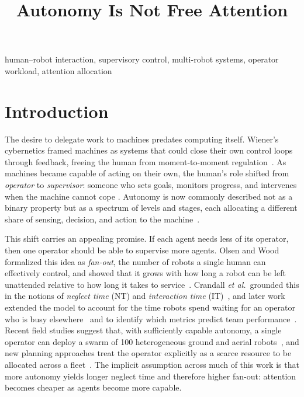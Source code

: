 \documentclass[conference]{IEEEtran}
\begin{document}
\title{Autonomy Is Not Free Attention}

\author{
}

\maketitle

\begin{abstract}


\end{abstract}

\begin{IEEEkeywords}
human–robot interaction, supervisory control, multi-robot systems, operator workload, attention allocation
\end{IEEEkeywords}

\section{Introduction}
\label{sec:intro}
The desire to delegate work to machines predates computing itself.
Wiener's cybernetics framed machines as systems that could close
their own control loops through feedback, freeing the human from
moment-to-moment regulation~\cite{wiener1948cybernetics}. As machines
became capable of acting on their own, the human's role shifted from
\emph{operator} to \emph{supervisor}: someone who sets goals,
monitors progress, and intervenes when the machine cannot cope
\cite{sheridan1992telerobotics}. Autonomy is now commonly described
not as a binary property but as a spectrum of levels and stages,
each allocating a different share of sensing, decision, and action
to the machine~\cite{parasuraman2000model}.

This shift carries an appealing promise. If each agent needs less
of its operator, then one operator should be able to supervise more
agents. Olsen and Wood formalized this idea as \emph{fan-out}, the
number of robots a single human can effectively control, and showed
that it grows with how long a robot can be left unattended relative
to how long it takes to service~\cite{olsen2004fanout}. Crandall
\emph{et al.}\ grounded this in the notions of \emph{neglect time}
(NT) and \emph{interaction time} (IT)~\cite{crandall2005validating},
and later work extended the model to account for the time robots
spend waiting for an operator who is busy
elsewhere~\cite{cummings2008predicting} and to identify which metrics
predict team performance~\cite{crandall2007identifying}. Recent field
studies suggest that, with sufficiently capable autonomy, a single
operator can deploy a swarm of 100 heterogeneous ground and aerial
robots~\cite{adams2023single}, and new planning
approaches treat the operator explicitly as a scarce resource to be
allocated across a fleet~\cite{costen2024multirobot}. The implicit
assumption across much of this work is that more autonomy yields
longer neglect time and therefore higher fan-out: attention becomes
cheaper as agents become more capable.
\end{document}
